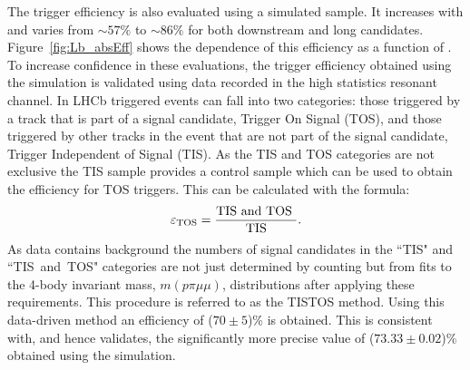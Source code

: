 The trigger efficiency is also evaluated using a simulated sample. It increases with \qsq and varies 
from $\sim 57\%$ to $\sim 86\%$ for both downstream and long candidates.
Figure~\ref{fig:Lb_absEff} shows the dependence of this efficiency as a function of \qsq.
To increase confidence in these evaluations, 
the trigger efficiency obtained using the simulation is validated using data recorded in the high statistics resonant channel.
In LHCb triggered events can fall into two categories: those triggered by a track that is part of a signal candidate, 
Trigger On Signal (TOS), and those triggered by other tracks in the event that are not part of the signal candidate, 
Trigger Independent of Signal (TIS). As the TIS and TOS categories are not exclusive the TIS sample provides a control
sample which can be used to obtain the efficiency for TOS triggers. This can be calculated with the formula:
\begin{equation}
\varepsilon_{\rm TOS} = \frac{\text{TIS  and TOS }}{\text{TIS}}.
\end{equation}
As data contains background the numbers of signal candidates in the ``TIS" and \mbox{``TIS and TOS"}
categories are not just determined by counting but from fits to the 4-body invariant mass, 
$m(p\pi\mu\mu)$, distributions after applying these requirements. This procedure is referred to as the TISTOS method. 
Using this data-driven method an efficiency of ($70 \pm 5$)\% is obtained. This is consistent with, and hence validates, 
the significantly more precise value of ($73.33 \pm 0.02$)\% obtained using the simulation.
%

